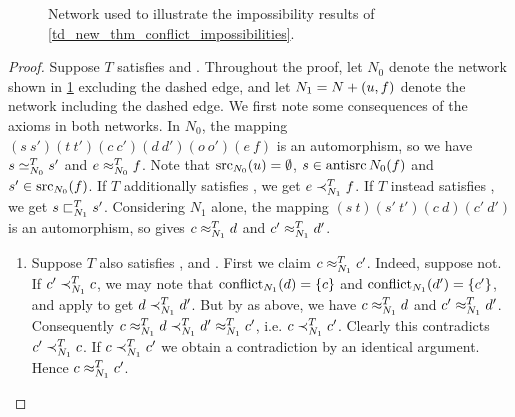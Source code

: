 \begin{figure}
    \centering
    \caption{
        Network used to illustrate the impossibility results of
        \cref{td_new_thm_conflict_impossibilities}.
    }
    \label{td_new_fig_conflict_impossibilities}
\end{figure}

\begin{proof}
    Suppose $T$ satisfies \symmetry{} and \claimcoherence{}.
    Throughout the proof, let $N_0$ denote the network shown in
    \cref{td_new_fig_conflict_impossibilities} excluding the dashed edge, and
    let $N_1 = {N} + ({u}, {f})$ denote the network including the dashed
    edge. We first note some consequences of the axioms in both networks. In
    $N_0$, the mapping $(s\ s')(t\ t')(c\ c')(d\ d')(o\ o')(e\ f)$ is an
    automorphism, so we have $s \simeq_{N_0}^T s'$ and $e \approx_{N_0}^T f$. Note
    that $\operatorname{src}_{N_0}(u) = \emptyset$, $s \in \operatorname{antisrc}{N_0}(f)$ and $s' \in
    \operatorname{src}_{N_0}(f)$. If $T$ additionally satisfies \freshposresp{}, we get $e
    \prec_{N_1}^T f$. If $T$ instead satisfies \sourceposresp{}, we get $s
    \sqsubset_{N_1}^T s'$.
    Considering $N_1$ alone, the mapping $(s\ t)(s'\ t')(c\ d)(c'\ d')$ is an
    automorphism, so \symmetry{} gives $c \approx_{N_1}^T d$ and $c' \approx_{N_1}^T
    d'$.

    \begin{enumerate}

        \item Suppose $T$ also satisfies \freshposresp{}, \sourcecoherence{}
              and \conflictcoherence{}. First we claim $c \approx_{N_1}^T c'$.
              Indeed, suppose not. If $c' \prec_{N_1}^T c$, we may note that
              $\operatorname{conflict}_{N_1}(d) = \{c\}$ and $\operatorname{conflict}_{N_1}(d') = \{c'\}$,
              and apply \conflictcoherence{} to get $d \prec_{N_1}^T d'$. But by
              \symmetry{} as above, we have $c \approx_{N_1}^T d$ and $c'
              \approx_{N_1}^T d'$. Consequently $c \approx_{N_1}^T d \prec_{N_1}^T d'
              \approx_{N_1}^T c'$, i.e. $c \prec_{N_1}^T c'$. Clearly this
              contradicts $c' \prec_{N_1}^T c$. If $c \prec_{N_1}^T c'$ we obtain
              a contradiction by an identical argument. Hence $c \approx_{N_1}^T
              c'$.


\end{enumerate}
\end{proof}
